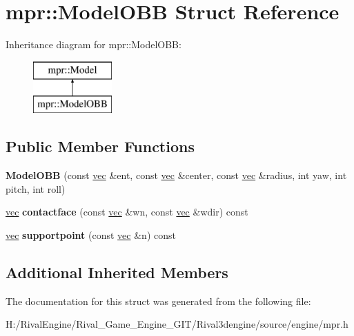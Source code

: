 \hypertarget{structmpr_1_1_model_o_b_b}{}\section{mpr\+:\+:Model\+O\+BB Struct Reference}
\label{structmpr_1_1_model_o_b_b}
Inheritance diagram for mpr\+:\+:Model\+O\+BB\+:\begin{figure}[H]
\begin{center}
\leavevmode
\includegraphics[height=2.000000cm]{structmpr_1_1_model_o_b_b}
\end{center}
\end{figure}
\subsection*{Public Member Functions}
\begin{DoxyCompactItemize}
\item 
\mbox{\label{structmpr_1_1_model_o_b_b_a918770381229ba7c8b0052f3f49615a0}} 
{\bfseries Model\+O\+BB} (const \hyperlink{structvec}{vec} \&ent, const \hyperlink{structvec}{vec} \&center, const \hyperlink{structvec}{vec} \&radius, int yaw, int pitch, int roll)
\item 
\mbox{\label{structmpr_1_1_model_o_b_b_a3909815cd5bdc45e28c90406c1f64e54}} 
\hyperlink{structvec}{vec} {\bfseries contactface} (const \hyperlink{structvec}{vec} \&wn, const \hyperlink{structvec}{vec} \&wdir) const
\item 
\mbox{\label{structmpr_1_1_model_o_b_b_ab7bcadd16fb858ff7fbc12a18c0c0577}} 
\hyperlink{structvec}{vec} {\bfseries supportpoint} (const \hyperlink{structvec}{vec} \&n) const
\end{DoxyCompactItemize}
\subsection*{Additional Inherited Members}


The documentation for this struct was generated from the following file\+:\begin{DoxyCompactItemize}
\item 
H\+:/\+Rival\+Engine/\+Rival\+\_\+\+Game\+\_\+\+Engine\+\_\+\+G\+I\+T/\+Rival3dengine/source/engine/mpr.\+h\end{DoxyCompactItemize}
